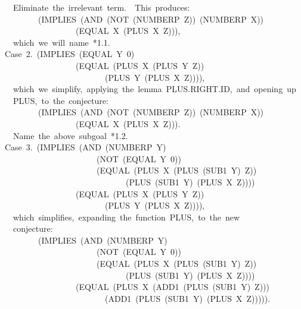 \documentclass[11pt]{book}
\newenvironment{pubasis}{\begin{flushleft}\ttfamily\small}{\normalsize\rmfamily\end{flushleft}}
\begin{document}
\begin{pubasis}
~~Eliminate~the~irrelevant~term.~~This~produces:\\

~~~~~~~~(IMPLIES~(AND~(NOT~(NUMBERP~Z))~(NUMBERP~X))\\
~~~~~~~~~~~~~~~~~(EQUAL~X~(PLUS~X~Z))),\\

~~which~we~will~name~*1.1.\\

Case~2.~(IMPLIES~(EQUAL~Y~0)\\
~~~~~~~~~~~~~~~~~(EQUAL~(PLUS~X~(PLUS~Y~Z))\\
~~~~~~~~~~~~~~~~~~~~~~~~(PLUS~Y~(PLUS~X~Z)))),\\

~~which~we~simplify,~applying~the~lemma~PLUS.RIGHT.ID,~and~opening~up\\
~~PLUS,~to~the~conjecture:\\

~~~~~~~~(IMPLIES~(AND~(NOT~(NUMBERP~Z))~(NUMBERP~X))\\
~~~~~~~~~~~~~~~~~(EQUAL~X~(PLUS~X~Z))).\\

~~Name~the~above~subgoal~*1.2.\\

Case~3.~(IMPLIES~(AND~(NUMBERP~Y)\\
~~~~~~~~~~~~~~~~~~~~~~(NOT~(EQUAL~Y~0))\\
~~~~~~~~~~~~~~~~~~~~~~(EQUAL~(PLUS~X~(PLUS~(SUB1~Y)~Z))\\
~~~~~~~~~~~~~~~~~~~~~~~~~~~~~(PLUS~(SUB1~Y)~(PLUS~X~Z))))\\
~~~~~~~~~~~~~~~~~(EQUAL~(PLUS~X~(PLUS~Y~Z))\\
~~~~~~~~~~~~~~~~~~~~~~~~(PLUS~Y~(PLUS~X~Z)))),\\

~~which~simplifies,~expanding~the~function~PLUS,~to~the~new\\
~~conjecture:\\

~~~~~~~~(IMPLIES~(AND~(NUMBERP~Y)\\
~~~~~~~~~~~~~~~~~~~~~~(NOT~(EQUAL~Y~0))\\
~~~~~~~~~~~~~~~~~~~~~~(EQUAL~(PLUS~X~(PLUS~(SUB1~Y)~Z))\\
~~~~~~~~~~~~~~~~~~~~~~~~~~~~~(PLUS~(SUB1~Y)~(PLUS~X~Z))))\\
~~~~~~~~~~~~~~~~~(EQUAL~(PLUS~X~(ADD1~(PLUS~(SUB1~Y)~Z)))\\
~~~~~~~~~~~~~~~~~~~~~~~~(ADD1~(PLUS~(SUB1~Y)~(PLUS~X~Z))))).\\


\end{pubasis}
\end{document}
